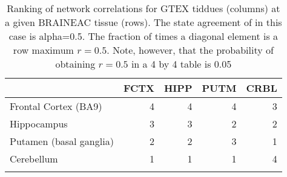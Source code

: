 \begin{longtable}{lrrrr}
  \hline
 & FCTX & HIPP & PUTM & CRBL \\ 
  \hline
Frontal Cortex (BA9) & 4 & 4 & 4 & 3 \\ 
  Hippocampus & 3 & 3 & 2 & 2 \\ 
  Putamen (basal ganglia) & 2 & 2 & 3 & 1 \\ 
  Cerebellum & 1 & 1 & 1 & 4 \\ 
   \hline
\hline
\caption{Ranking of network correlations for GTEX tiddues (columns) at a given BRAINEAC tissue (rows). The state agreement of in this case is alpha=0.5. The fraction of times a diagonal element is a row maximum $r=0.5$. Note, however, that the probability of obtaining $r=0.5$ in a 4 by 4 table is 0.05} 
\label{RankBRAINEAC}
\end{longtable}
